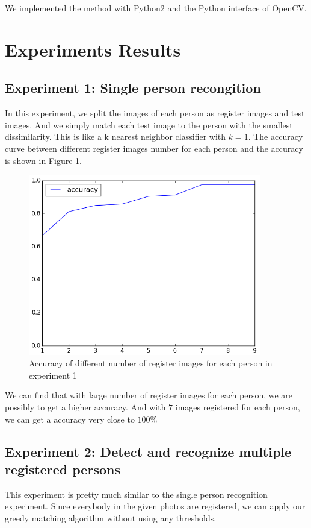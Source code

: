 \documentclass[paper=a4, fontsize=11pt]{scrartcl} %
\numberwithin{equation}{section} %
\numberwithin{figure}{section} %
\numberwithin{table}{section} %
\begin{document}
We implemented the method with Python2 and the Python interface of OpenCV.

\section{Experiments Results}
\subsection{Experiment 1: Single person recongition}
In this experiment, we split the images of each person as register images and test images. And we simply match each test image to the person with the smallest dissimilarity. This is like a k nearest neighbor classifier with $k=1$. The accuracy curve between different register images number for each person and the accuracy is shown in Figure \ref{fig:acc_single}.

\begin{figure}[!htbp]
	\centering
	\includegraphics[width=4in]{acc_single.png}
	\caption{Accuracy of different number of register images for each person in experiment 1}
	\label{fig:acc_single}
\end{figure}

We can find that with large number of register images for each person, we are possibly to get a higher accuracy. And with $7$ images registered for each person, we can get a accuracy very close to $100\%$

\subsection{Experiment 2: Detect and recognize multiple registered persons}
This experiment is pretty much similar to the single person recognition experiment. Since everybody in the given photos are registered, we can apply our greedy matching algorithm without using any thresholds. 
\end{document}
